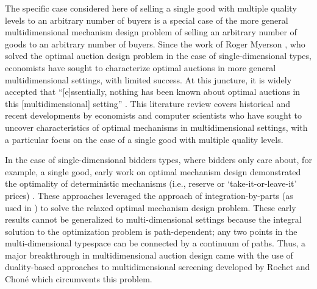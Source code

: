 The specific case considered here of selling a single good with multiple quality levels to an arbitrary number of buyers is a special case of the more general multidimensional mechanism design problem of selling an arbitrary number of goods to an arbitrary number of buyers. Since the work of Roger Myerson \autocite*{myerson1981optimal}, who solved the optimal auction design problem in the case of single-dimensional types, economists have sought to characterize optimal auctions in more general multidimensional settings, with limited success. At this juncture, it is widely accepted that ``[e]ssentially, nothing has been known about optimal auctions in this [multidimensional] setting'' \autocite[p1]{kolesnikov2022}. This literature review covers historical and recent developments by economists and computer scientists who have sought to uncover characteristics of optimal mechanisms in multidimensional settings, with a particular focus on the case of a single good with multiple quality levels.

In the case of single-dimensional bidders types, where bidders only care about, for example, a single good, early work on optimal mechanism design demonstrated the optimality of deterministic mechanisms (i.e., reserve or `take-it-or-leave-it' prices) \autocite{myerson1981optimal,riley1983}. These approaches leveraged the approach of integration-by-parts (as used in \cite{mussa1978}) to solve the relaxed optimal mechanism design problem. These early results cannot be generalized to multi-dimensional settings because the integral solution to the optimization problem is path-dependent; any two points in the multi-dimensional typespace can be connected by a continuum of paths. Thus, a major breakthrough in multidimensional auction design came with the use of duality-based approaches to multidimensional screening developed by Rochet and Choné \autocite*{rochet1998ironing} which circumvents this problem.

